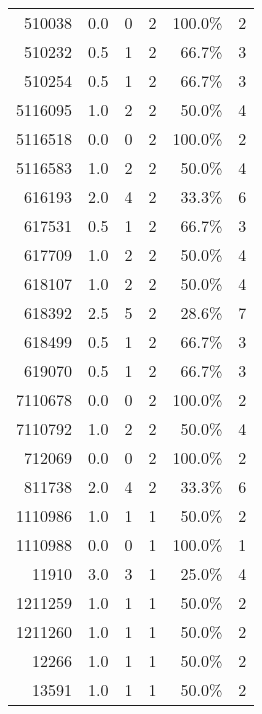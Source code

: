 \begin{longtable}{lrrrrr}
	    \multicolumn{1}{r}{510038} & 0.0   & 0     & 2     & 100.0\% & 2 \\
	    \multicolumn{1}{r}{510232} & 0.5   & 1     & 2     & 66.7\% & 3 \\
	    \multicolumn{1}{r}{510254} & 0.5   & 1     & 2     & 66.7\% & 3 \\
	    \multicolumn{1}{r}{5116095} & 1.0   & 2     & 2     & 50.0\% & 4 \\
	    \multicolumn{1}{r}{5116518} & 0.0   & 0     & 2     & 100.0\% & 2 \\
	    \multicolumn{1}{r}{5116583} & 1.0   & 2     & 2     & 50.0\% & 4 \\
	    \multicolumn{1}{r}{616193} & 2.0   & 4     & 2     & 33.3\% & 6 \\
	    \multicolumn{1}{r}{617531} & 0.5   & 1     & 2     & 66.7\% & 3 \\
	    \multicolumn{1}{r}{617709} & 1.0   & 2     & 2     & 50.0\% & 4 \\
	    \multicolumn{1}{r}{618107} & 1.0   & 2     & 2     & 50.0\% & 4 \\
	    \multicolumn{1}{r}{618392} & 2.5   & 5     & 2     & 28.6\% & 7 \\
	    \multicolumn{1}{r}{618499} & 0.5   & 1     & 2     & 66.7\% & 3 \\
	    \multicolumn{1}{r}{619070} & 0.5   & 1     & 2     & 66.7\% & 3 \\
	    \multicolumn{1}{r}{7110678} & 0.0   & 0     & 2     & 100.0\% & 2 \\
	    \multicolumn{1}{r}{7110792} & 1.0   & 2     & 2     & 50.0\% & 4 \\
	    \multicolumn{1}{r}{712069} & 0.0   & 0     & 2     & 100.0\% & 2 \\
	    \multicolumn{1}{r}{811738} & 2.0   & 4     & 2     & 33.3\% & 6 \\
	    \multicolumn{1}{r}{1110986} & 1.0   & 1     & 1     & 50.0\% & 2 \\
	    \multicolumn{1}{r}{1110988} & 0.0   & 0     & 1     & 100.0\% & 1 \\
	    \multicolumn{1}{r}{11910} & 3.0   & 3     & 1     & 25.0\% & 4 \\
	    \multicolumn{1}{r}{1211259} & 1.0   & 1     & 1     & 50.0\% & 2 \\
	    \multicolumn{1}{r}{1211260} & 1.0   & 1     & 1     & 50.0\% & 2 \\
	    \multicolumn{1}{r}{12266} & 1.0   & 1     & 1     & 50.0\% & 2 \\
	    \multicolumn{1}{r}{13591} & 1.0   & 1     & 1     & 50.0\% & 2 \\

\end{longtable}
